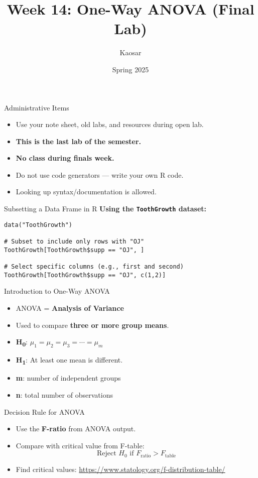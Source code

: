 \documentclass{beamer}
\title[STAT 3611]{Week 14: One-Way ANOVA (Final Lab)}
\author{Kaosar}
\institute{Auburn University}
\date{Spring 2025}
\begin{document}
\begin{frame}
\titlepage
\end{frame}

\begin{frame}{Administrative Items}
\begin{itemize}
    \item Use your note sheet, old labs, and resources during open lab.
    \item \textbf{This is the last lab of the semester.}
    \item \textbf{No class during finals week.}
    \item Do not use code generators — write your own R code.
    \item Looking up syntax/documentation is allowed.
\end{itemize}
\end{frame}

\begin{frame}[fragile]{Subsetting a Data Frame in R}
\textbf{Using the \texttt{ToothGrowth} dataset:}
\begin{verbatim}
data("ToothGrowth")

# Subset to include only rows with "OJ"
ToothGrowth[ToothGrowth$supp == "OJ", ]

# Select specific columns (e.g., first and second)
ToothGrowth[ToothGrowth$supp == "OJ", c(1,2)]
\end{verbatim}
\end{frame}

\begin{frame}{Introduction to One-Way ANOVA}
\begin{itemize}
    \item ANOVA = \textbf{Analysis of Variance}
    \item Used to compare \textbf{three or more group means}.
    \item \textbf{H\textsubscript{0}}: \( \mu_1 = \mu_2 = \mu_3 = \cdots = \mu_m \)
    \item \textbf{H\textsubscript{1}}: At least one mean is different.
    \item \textbf{m}: number of independent groups
    \item \textbf{n}: total number of observations
\end{itemize}
\end{frame}

\begin{frame}{Decision Rule for ANOVA}
\begin{itemize}
    \item Use the \textbf{F-ratio} from ANOVA output.
    \item Compare with critical value from F-table:
    \[ \text{Reject } H_0 \text{ if } F_{\text{ratio}} > F_{\text{table}} \]
    \item Find critical values: \url{https://www.statology.org/f-distribution-table/}
\end{itemize}
\end{frame}
\end{document}

